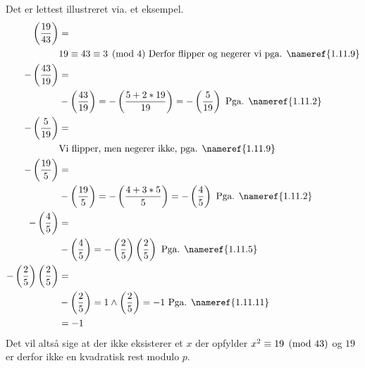 Det er lettest illustreret via. et eksempel.
\begin{align*}
  \myfrac{19}{43} &=\\
  &19 \equiv 43 \mycong{3}{4} \text{ Derfor flipper og negerer vi pga.
  \nameref{1.11.9}}\\
  -\myfrac{43}{19} &=\\
  &-\myfrac{43}{19} = -\myfrac{5 + 2*19}{19} = -\myfrac{5}{19} \text{ Pga.
  \nameref{1.11.2}} \\
  -\myfrac{5}{19} &=\\
  &\text{Vi flipper, men negerer ikke, pga. \nameref{1.11.9}}\\
  -\myfrac{19}{5} &=\\
  &-\myfrac{19}{5} = -\myfrac{4 + 3*5}{5} = -\myfrac{4}{5} \text{ Pga.
  \nameref{1.11.2}} \\
  -\myfrac{4}{5} &=\\
  &-\myfrac{4}{5} = -\myfrac{2}{5} \myfrac{2}{5} \text{ Pga. \nameref{1.11.5}}\\
  -\myfrac{2}{5} \myfrac{2}{5} &=\\
  &-\myfrac{2}{5} = 1 \myand \myfrac{2}{5} = -1 \text{ Pga. \nameref{1.11.11}}\\
  &= -1
\end{align*}
Det vil altså sige at der ikke eksisterer et $x$ der opfylder $x^2
\equiv 19 \pmod{43}$ og $19$ er derfor ikke en kvadratisk rest modulo $p$.